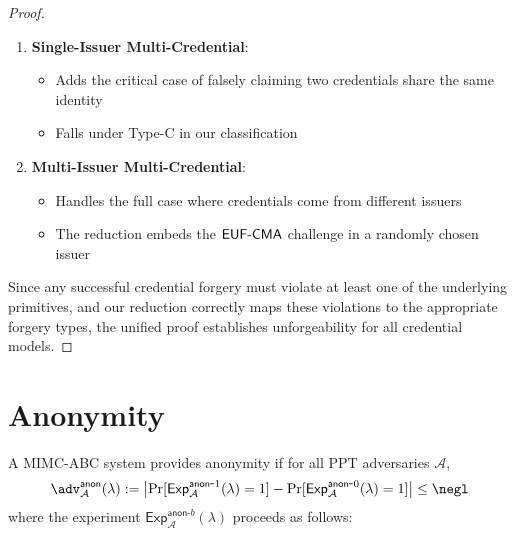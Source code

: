 \begin{proof}
\begin{enumerate}
    \item \textbf{Single-Issuer Multi-Credential}:
    \begin{itemize}
        \item Adds the critical case of falsely claiming two credentials share the same identity
        \item Falls under Type-C in our classification
    \end{itemize}
    
    \item \textbf{Multi-Issuer Multi-Credential}:
    \begin{itemize}
        \item Handles the full case where credentials come from different issuers
        \item The reduction embeds the $\mathsf{EUF\text{-}CMA}$ challenge in a randomly chosen issuer
    \end{itemize}
\end{enumerate}

Since any successful credential forgery must violate at least one of the underlying primitives, and our reduction correctly maps these violations to the appropriate forgery types, the unified proof establishes unforgeability for all credential models.
\end{proof}



\section{Anonymity}


\begin{definition}
A MIMC-ABC system provides anonymity if for all PPT adversaries $\mathcal{A}$,
\[
\adv^{\mathsf{anon}}_{\mathcal{A}}(\lambda) := \left|\Pr[\mathsf{Exp}^{\mathsf{anon}\mbox{-}1}_{\mathcal{A}}(\lambda)=1] - \Pr[\mathsf{Exp}^{\mathsf{anon}\mbox{-}0}_{\mathcal{A}}(\lambda)=1]\right| \leq \negl
\]
where the experiment $\mathsf{Exp}^{\mathsf{anon}\mbox{-}b}_{\mathcal{A}}(\lambda)$ proceeds as follows:
\end{definition}

